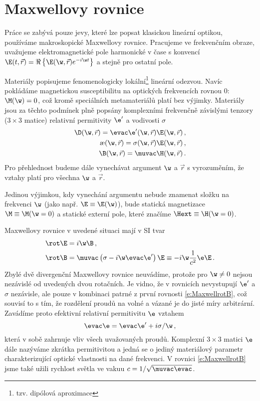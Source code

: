 \section{Maxwellovy rovnice \cite{Bornwolf}}

Práce se zabývá pouze jevy, které lze popsat klasickou lineární optikou, používáme makroskopické Maxwellovy rovnice.
Pracujeme ve frekvenčním obraze, uvažujeme elektromagnetické pole harmonické v čase s konvencí $\E(t,\vec{r})=\Re\left\lbrace\E(\w,\vec{r}) e^{-i\w t}\right\rbrace$ a stejně pro ostatní pole.

Materiály popisujeme fenomenologicky lokální\footnote{tzv. dipólová aproximace} lineární odezvou.
Navíc pokládáme magnetickou susceptibilitu na optických frekvencích rovnou 0: $\M(\w)=0$, což kromě speciálních metamateriálů platí bez výjimky\cite{muvac1}.
Materiály jsou za těchto podmínek plně popsány komplexními frekvenčně závislými tenzory ($3\times 3$ matice) relativní permitivity  $\e'$ a vodivosti $\sigma$
\begin{align}
\D(\w,\vec{r})=\evac\e'(\w,\vec{r})\E(\w,\vec{r}) \,, \label{e:materialyD} \\
\j(\w,\vec{r})=\sigma(\w,\vec{r})\E(\w,\vec{r}) \,, \\
\B(\w,\vec{r})=\muvac \H(\w,\vec{r}) \label{e:materialyB} \,.
\end{align}
Pro přehlednost budeme dále vynechávat argument $\w$ a $\vec{r}$ s vyrozuměním, že vztahy platí pro všechna $\w$ a $\vec{r}$.

Jedinou výjimkou, kdy vynechání argumentu nebude znamenat složku na frekvenci $\w$ (jako např. $\E\equiv\E(\w)$), bude statická magnetizace $\M\equiv\M(\w=0)$ a statické externí pole, které značíme $\Hext\equiv\H(\w=0)$.

Maxwellovy rovnice v uvedené situaci mají v SI tvar
\begin{align}
\rot \E&=i\w\B \,, \\
\rot \B&=\muvac \left( \sigma - i\w \evac\e' \right) \E \equiv -i\w\frac{1}{c^2}\e \E \,. \label{e:MaxwellrotB}
\end{align}
Zbylé dvě divergenční Maxwellovy rovnice neuvádíme, protože pro $\w\neq0$ nejsou nezávislé od uvedených dvou rotačních\cite{Visvlakna}.
Je vidno, že v rovnicích nevystupují $\e'$ a $\sigma$ nezávisle, ale pouze v kombinaci patrné z první rovnosti \eqref{e:MaxwellrotB}, což souvisí to s tím, že rozdělení proudů na volné a vázané je do jisté míry arbitrární.
Zavádíme proto efektivní relativní permitivitu $\e$ vztahem
\begin{equation}
\evac \e=\evac\e'+i\sigma/\w \,,
\end{equation}
která v sobě zahrnuje vliv všech uvažovaných proudů.
Komplexní $3\times 3$ matici $\e$ dále nazýváme zkrátka permitivitou a jedná se o jediný materiálový parametr charakterizující optické vlastnosti na dané frekvenci.
V rovnici \eqref{e:MaxwellrotB} jsme také užili rychlost světla ve vakuu $c=1/\sqrt{\muvac\evac}$.

